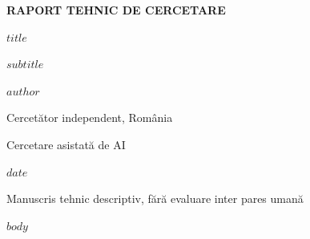 \documentclass[12pt,a4paper]{article}
\renewcommand{\_}{\textunderscore\allowbreak}
\begin{document}
\pagestyle{plain}
\begin{center}
\vspace*{3cm}
{\bfseries RAPORT TEHNIC DE CERCETARE\par}
\vspace{2.2cm}
{\large\bfseries $title$\par}
\vspace{1cm}
{\bfseries $subtitle$\par}
\vspace{2.5cm}
{\bfseries $author$\par}
Cercetător independent, România\par
Cercetare asistată de AI\par
\vfill
$date$\par
{\small Manuscris tehnic descriptiv, fără evaluare inter pares umană\par}
\end{center}
\clearpage
{\singlespacing\tableofcontents}
\clearpage
$body$
\end{document}
